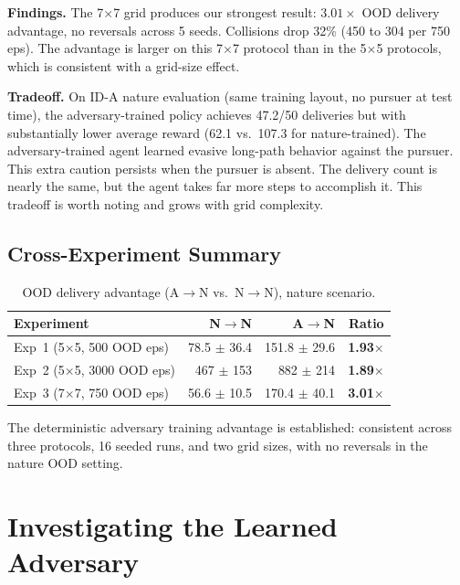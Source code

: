 \documentclass[sigconf]{aamas}
\begin{document}
\textbf{Findings.} The 7$\times$7 grid produces our strongest result:
$3.01\times$ OOD delivery advantage, no reversals across 5 seeds.
Collisions drop 32\% (450 to 304 per 750 eps). The advantage is larger on this
7$\times$7 protocol than in the 5$\times$5 protocols, which is consistent with a grid-size effect.

\textbf{Tradeoff.} On ID-A nature evaluation (same training layout, no
pursuer at test time), the adversary-trained policy achieves 47.2/50 deliveries but
with substantially lower average reward (62.1 vs.\ 107.3 for nature-trained). The
adversary-trained agent learned evasive long-path behavior against the pursuer. This
extra caution persists when the pursuer is absent. The delivery count is nearly the
same, but the agent takes far more steps to accomplish it. This tradeoff is worth noting and
grows with grid complexity.

\subsection{Cross-Experiment Summary}

\begin{table}[H]
\caption{OOD delivery advantage (A$\to$N vs.\ N$\to$N), nature scenario.}
\label{tab:cross-exp}
\centering
\footnotesize
\begin{tabular}{lrrr}
\toprule
\textbf{Experiment} & \textbf{N$\to$N} & \textbf{A$\to$N} & \textbf{Ratio} \\
\midrule
Exp~1 (5$\times$5, 500 OOD eps)  & 78.5 $\pm$ 36.4  & 151.8 $\pm$ 29.6 & \textbf{1.93$\times$} \\
Exp~2 (5$\times$5, 3000 OOD eps) & 467 $\pm$ 153    & 882 $\pm$ 214    & \textbf{1.89$\times$} \\
Exp~3 (7$\times$7, 750 OOD eps)  & 56.6 $\pm$ 10.5  & 170.4 $\pm$ 40.1 & \textbf{3.01$\times$} \\
\bottomrule
\end{tabular}
\end{table}

The deterministic adversary training advantage is established: consistent across
three protocols, 16 seeded runs, and two grid sizes, with no reversals in the nature OOD
setting.

\section{Investigating the Learned Adversary}
\label{sec:learned}
\end{document}
